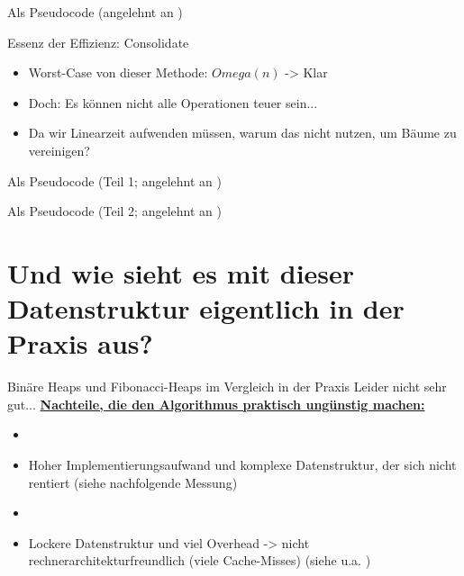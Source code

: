 \documentclass{beamer}
\begin{document}
	\begin{frame}{Als Pseudocode (angelehnt an \cite{CORMEN17})}
		
	\end{frame}
	
	\begin{frame} {Essenz der Effizienz: Consolidate}
		\begin{itemize}
			\item Worst-Case von dieser Methode: $Omega(n)$ -> Klar
			\item Doch: Es k\"onnen nicht alle Operationen teuer sein...
			\item Da wir Linearzeit aufwenden m\"ussen, warum das nicht nutzen, um B\"aume zu vereinigen?
		\end{itemize}
	\end{frame}
	\begin{frame}{Als Pseudocode (Teil 1; angelehnt an \cite{CORMEN17})}
		
	\end{frame}
	
	\begin{frame}{Als Pseudocode (Teil 2; angelehnt an \cite{CORMEN17})}
		
	\end{frame}

	\section{Und wie sieht es mit dieser Datenstruktur eigentlich in der Praxis aus?}
	\begin{frame}{Bin\"are Heaps und Fibonacci-Heaps im Vergleich in der Praxis}
		 Leider nicht sehr gut...		 
		 \underline{\textbf{Nachteile, die den Algorithmus praktisch ung\"unstig machen:}}
		\begin{itemize}
			\item[] %
			\item Hoher Implementierungsaufwand und komplexe Datenstruktur, der sich nicht rentiert (siehe nachfolgende Messung)
			\item[] %
			\item Lockere Datenstruktur und viel Overhead -> nicht rechnerarchitekturfreundlich (viele Cache-Misses) (siehe u.a. \cite{TAN14})
		\end{itemize}
	\end{frame}
	
\end{document}
